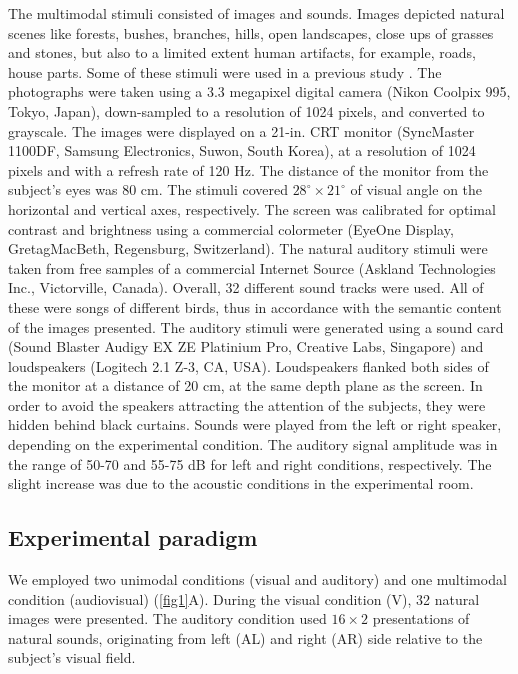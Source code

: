 The multimodal stimuli consisted of images and sounds. Images depicted
natural scenes like forests, bushes, branches, hills, open landscapes,
close ups of grasses and stones, but also to a limited extent human
artifacts, for example, roads, house parts. Some of these stimuli were used
in a previous study \citep{einhaeuser2003a}. The photographs were taken
using a 3.3 megapixel digital camera (Nikon Coolpix 995, Tokyo, Japan),
down-sampled to a resolution of 1024  pixels, and converted
to grayscale. The images were displayed on a 21-in. CRT monitor (SyncMaster
1100DF, Samsung Electronics, Suwon, South Korea), at a resolution of 1024
 pixels and with a refresh rate of 120 Hz. The distance of
the monitor from the subject's eyes was 80 cm. The stimuli covered
$28^\circ \times 21^\circ$ of visual angle on the horizontal and vertical
axes, respectively. The screen was calibrated for optimal contrast and
brightness using a commercial colormeter (EyeOne Display, GretagMacBeth,
Regensburg, Switzerland). The natural auditory stimuli were taken from free
samples of a commercial Internet Source (Askland Technologies Inc.,
Victorville, Canada). Overall, 32 different sound tracks were used. All of
these were songs of different birds, thus in accordance with the semantic
content of the images presented. The auditory stimuli were generated using
a sound card (Sound Blaster Audigy EX ZE Platinium Pro, Creative Labs,
Singapore) and loudspeakers (Logitech 2.1 Z-3, CA, USA). Loudspeakers
flanked both sides of the monitor at a distance of 20 cm, at the same depth
plane as the screen. In order to avoid the speakers attracting the
attention of the subjects, they were hidden behind black curtains. Sounds
were played from the left or right speaker, depending on the experimental
condition. The auditory signal amplitude was in the range of 50-70 and
55-75 dB for left and right conditions, respectively. The slight increase
was due to the acoustic conditions in the experimental room.

\subsection{Experimental paradigm}

We employed two unimodal conditions (visual and auditory) and one
multimodal condition (audiovisual) (\ref{fig1}A). During the visual
condition (V), 32 natural images were presented. The auditory condition
used $16 \times 2$ presentations of natural sounds, originating from left
(AL) and right (AR) side relative to the subject's visual field.


